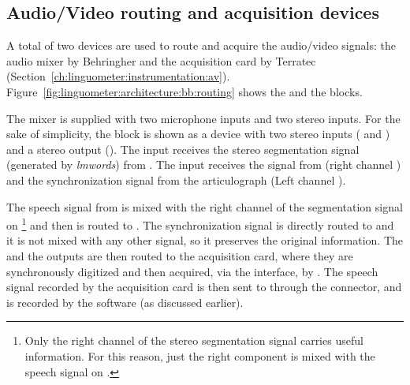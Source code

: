 \subsection{Audio/Video routing and acquisition devices}

A total of two devices are used to route and acquire the audio/video signals:
the  audio mixer by Behringher and the  acquisition card by
Terratec (Section~\ref{ch:linguometer:instrumentation:av}).
Figure~\ref{fig:linguometer:architecture:bb:routing} shows the  and the
 blocks.

The  mixer is supplied with two microphone inputs and two stereo
inputs.
For the sake of simplicity,  the  block is shown as a device with 
two stereo inputs ( and ) and a stereo output
().
The  input receives the stereo segmentation signal (generated by 
\emph{lmwords}) from .
The  input receives the  signal from  (right
channel ) and the synchronization signal  from 
the  articulograph (Left channel ).

The speech signal from  is mixed with the right channel of
the segmentation signal on \footnote{Only the right channel of
the stereo segmentation signal carries useful information. For this reason,
just the right component is mixed with the speech signal on .} 
and then is routed to . 
The synchronization signal  is directly routed to 
and it is not mixed with any other signal, so it preserves the original
information.
The  and the  outputs are then routed to the
 acquisition card, where they are synchronously digitized and then
acquired, via the  interface, by .
The speech signal recorded by the acquisition card is then sent to 
through the  connector, and is recorded by the 
software (as discussed earlier).
